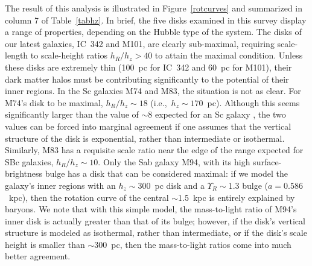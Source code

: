 \documentclass[12pt,preprint]{emulateapj}
\newcommand{\ie}{{i.e.,}}
\begin{document}
The result of this analysis is illustrated in Figure~\ref{rotcurves} and summarized in column 7 of Table~\ref{tabhz}.  In brief, the five disks examined in this survey display a range of properties, depending on the Hubble type of the system.  The disks of our latest galaxies, IC~342 and M101, are clearly sub-maximal, requiring scale-length to scale-height ratios $h_R/h_z > 40$ to attain the maximal condition.  Unless these disks are extremely thin (100~pc for IC~342 and 60~pc for M101), their dark matter halos must be contributing significantly to the potential of their inner regions.   In the Sc galaxies M74 and M83, the situation is not as clear.  For M74's disk to be maximal, $h_R/h_z \sim 18$ (\ie\ $h_z \sim 170$~pc).  Although this seems significantly larger than the value of $\sim$8 expected for an Sc galaxy \citep{dG98}, the two values can be forced into marginal agreement if one assumes that the vertical structure of the disk is exponential, rather than intermediate or isothermal.   Similarly, M83 has a requisite scale ratio near the edge of the range expected for SBc galaxies, $h_R/h_z \sim 10$.  Only the Sab galaxy M94, with its high surface-brightness bulge has a disk that can be considered maximal:  if we model the galaxy's inner regions with an $h_z \sim 300$~pc disk and a $\Upsilon_R \sim 1.3$ \citet{h90} bulge ($a = 0.586$~kpc), then the rotation curve of the central $\sim$1.5~kpc is entirely explained by baryons.  We note that with this simple model, the mass-to-light ratio of M94's inner disk is actually greater than that of its bulge; however, if the disk's vertical structure is modeled as isothermal, rather than intermediate, or if the disk's scale height is smaller than $\sim$300~pc, then the mass-to-light ratios come into much better agreement.
\end{document}
